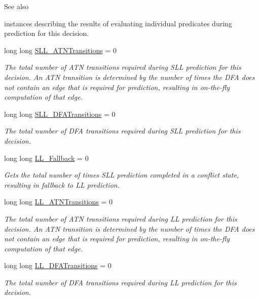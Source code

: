 \begin{DoxyCompactItemize}
\begin{DoxyCompactList}
\begin{DoxySeeAlso}{See also}
\end{DoxySeeAlso}
instances describing the results of evaluating individual predicates during prediction for this decision. \end{DoxyCompactList}\item 
long long \hyperlink{classantlr4_1_1atn_1_1DecisionInfo_af3e230f5955ff56df52e821b8b8fefd8}{S\+L\+L\+\_\+\+A\+T\+N\+Transitions} = 0
\begin{DoxyCompactList}\small\item\em The total number of A\+TN transitions required during S\+LL prediction for this decision. An A\+TN transition is determined by the number of times the D\+FA does not contain an edge that is required for prediction, resulting in on-\/the-\/fly computation of that edge. \end{DoxyCompactList}\item 
long long \hyperlink{classantlr4_1_1atn_1_1DecisionInfo_a95666f6bd1c67636006fc026c7315e5b}{S\+L\+L\+\_\+\+D\+F\+A\+Transitions} = 0
\begin{DoxyCompactList}\small\item\em The total number of D\+FA transitions required during S\+LL prediction for this decision. \end{DoxyCompactList}\item 
long long \hyperlink{classantlr4_1_1atn_1_1DecisionInfo_a311fb2f2a4f7c6108106b8700f03cb18}{L\+L\+\_\+\+Fallback} = 0
\begin{DoxyCompactList}\small\item\em Gets the total number of times S\+LL prediction completed in a conflict state, resulting in fallback to LL prediction. \end{DoxyCompactList}\item 
long long \hyperlink{classantlr4_1_1atn_1_1DecisionInfo_a4e600839653af69293014d3aa7d4e6fd}{L\+L\+\_\+\+A\+T\+N\+Transitions} = 0
\begin{DoxyCompactList}\small\item\em The total number of A\+TN transitions required during LL prediction for this decision. An A\+TN transition is determined by the number of times the D\+FA does not contain an edge that is required for prediction, resulting in on-\/the-\/fly computation of that edge. \end{DoxyCompactList}\item 
long long \hyperlink{classantlr4_1_1atn_1_1DecisionInfo_a9d709cc94f1b7886e1c3be5cf46ac2c4}{L\+L\+\_\+\+D\+F\+A\+Transitions} = 0
\begin{DoxyCompactList}\small\item\em The total number of D\+FA transitions required during LL prediction for this decision. \end{DoxyCompactList}\end{DoxyCompactItemize}



